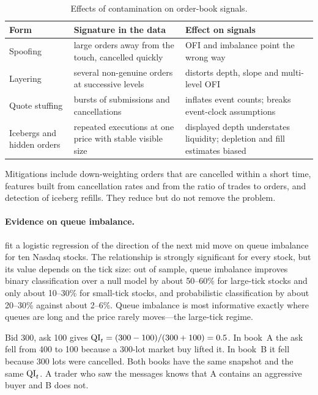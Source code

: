 \begin{table}[!htbp]
\centering\footnotesize
\caption{Effects of contamination on order-book signals.}
\label{tab:contamination}
\begin{tabularx}{\linewidth}{l>{\raggedright\arraybackslash}X>{\raggedright\arraybackslash}X}
\toprule
Form & Signature in the data & Effect on signals \\
\midrule
Spoofing & large orders away from the touch, cancelled quickly & OFI and imbalance point the wrong way \\
Layering & several non-genuine orders at successive levels & distorts depth, slope and multi-level OFI \\
Quote stuffing & bursts of submissions and cancellations & inflates event counts; breaks event-clock assumptions \\
Icebergs and hidden orders & repeated executions at one price with stable visible size & displayed depth understates liquidity; depletion and fill estimates biased \\
\bottomrule
\end{tabularx}
\end{table}

Mitigations include down-weighting orders that are cancelled within a short time, features built from
cancellation rates and from the ratio of trades to orders, and detection of iceberg refills. They reduce
but do not remove the problem.

\paragraph{Evidence on queue imbalance.} \citet{gould2016qi} fit a logistic regression of the direction of the next
mid move on queue imbalance for ten Nasdaq stocks. The relationship is strongly significant for
every stock, but its value depends on the tick size: out of sample, queue imbalance improves binary
classification over a null model by about 50--60\% for large-tick stocks and only about 10--30\% for
small-tick stocks, and probabilistic classification by about 20--30\% against about 2--6\%. Queue
imbalance is most informative exactly where queues are long and the price rarely moves---the
large-tick regime.

\begin{example}
\label{ex:qi}
Bid 300, ask 100 gives $\mathrm{QI}_t = (300-100)/(300+100) = 0.5$. In book~A the ask fell from 400 to 100
because a 300-lot market buy lifted it. In book~B it fell because 300 lots were cancelled. Both
books have the same snapshot and the same $\mathrm{QI}_t$. A trader who saw the messages knows that A
contains an aggressive buyer and B does not.
\end{example}

